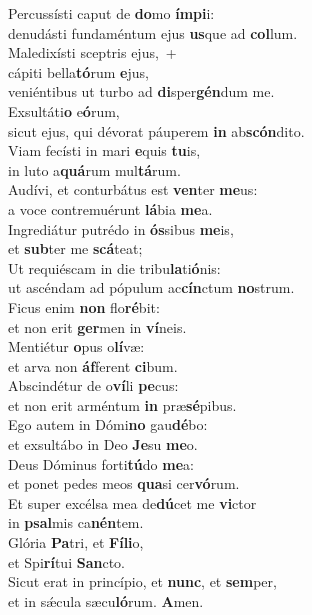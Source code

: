 \evenverse Percussísti caput de \textbf{do}mo \textbf{ím}\textbf{pi}i:~\*\\
\evenverse denudásti fundaméntum ejus \textbf{us}que ad \textbf{col}lum.\\
\oddverse Maledixísti sceptris ejus,~+\\
\oddverse  cápiti bella\textbf{tó}rum \textbf{e}jus,~\*\\
\oddverse veniéntibus ut turbo ad \textbf{di}sper\textbf{gén}dum me.\\
\evenverse Exsultáti\textbf{o} e\textbf{ó}rum,~\*\\
\evenverse sicut ejus, qui dévorat páuperem \textbf{in} ab\textbf{scón}dito.\\
\oddverse Viam fecísti in mari \textbf{e}quis \textbf{tu}is,~\*\\
\oddverse in luto a\textbf{quá}rum mul\textbf{tá}rum.\\
\evenverse Audívi, et conturbátus est \textbf{ven}ter \textbf{me}us:~\*\\
\evenverse a voce contremuérunt \textbf{lá}bia \textbf{me}a.\\
\oddverse Ingrediátur putrédo in \textbf{ós}sibus \textbf{me}is,~\*\\
\oddverse et \textbf{sub}ter me \textbf{scá}teat;\\
\evenverse Ut requiéscam in die tribu\textbf{la}ti\textbf{ó}nis:~\*\\
\evenverse ut ascéndam ad pópulum ac\textbf{cín}ctum \textbf{no}strum.\\
\oddverse Ficus enim \textbf{non} flo\textbf{ré}bit:~\*\\
\oddverse et non erit \textbf{ger}men in \textbf{ví}neis.\\
\evenverse Mentiétur \textbf{o}pus o\textbf{lí}væ:~\*\\
\evenverse et arva non \textbf{áf}ferent \textbf{ci}bum.\\
\oddverse Abscindétur de o\textbf{ví}li \textbf{pe}cus:~\*\\
\oddverse et non erit arméntum \textbf{in} præ\textbf{sé}pibus.\\
\evenverse Ego autem in Dómi\textbf{no} gau\textbf{dé}bo:~\*\\
\evenverse et exsultábo in Deo \textbf{Je}su \textbf{me}o.\\
\oddverse Deus Dóminus forti\textbf{tú}do \textbf{me}a:~\*\\
\oddverse et ponet pedes meos \textbf{qua}si cer\textbf{vó}rum.\\
\evenverse Et super excélsa mea de\textbf{dú}cet me \textbf{vi}ctor~\*\\
\evenverse in \textbf{psal}mis ca\textbf{nén}tem.\\
\oddverse Glória \textbf{Pa}tri, et \textbf{Fí}\textbf{li}o,~\*\\
\oddverse et Spi\textbf{rí}tui \textbf{San}cto.\\
\evenverse Sicut erat in princípio, et \textbf{nunc}, et \textbf{sem}per,~\*\\
\evenverse et in sǽcula sæcu\textbf{ló}rum. \textbf{A}men.\\
